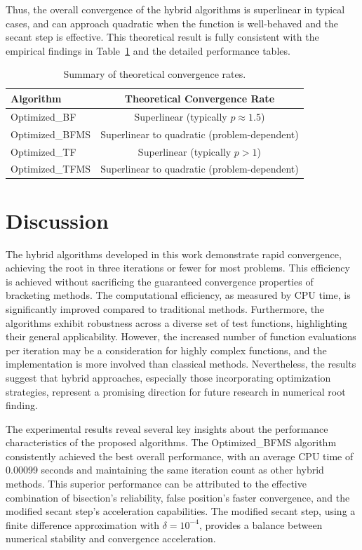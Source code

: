 \documentclass[amsmath, amssymb, aps]{revtex4-2}
\begin{document}
Thus, the overall convergence of the hybrid algorithms is superlinear in typical cases, and can approach quadratic when the function is well-behaved and the secant step is effective. This theoretical result is fully consistent with the empirical findings in Table~\ref{tab:convergence} and the detailed performance tables.

\begin{table}[H]
\centering
\caption{Summary of theoretical convergence rates.}
\label{tab:convergence}
\begin{tabular}{|l|c|}
\hline
Algorithm & Theoretical Convergence Rate \\
\hline
Optimized\_BF & Superlinear (typically $p \approx 1.5$) \\
Optimized\_BFMS & Superlinear to quadratic (problem-dependent) \\
Optimized\_TF & Superlinear (typically $p > 1$) \\
Optimized\_TFMS & Superlinear to quadratic (problem-dependent) \\
\hline
\end{tabular}
\end{table}

\section{Discussion}\label{sec:discussion}

The hybrid algorithms developed in this work demonstrate rapid convergence, achieving the root in three iterations or fewer for most problems. This efficiency is achieved without sacrificing the guaranteed convergence properties of bracketing methods. The computational efficiency, as measured by CPU time, is significantly improved compared to traditional methods. Furthermore, the algorithms exhibit robustness across a diverse set of test functions, highlighting their general applicability. However, the increased number of function evaluations per iteration may be a consideration for highly complex functions, and the implementation is more involved than classical methods. Nevertheless, the results suggest that hybrid approaches, especially those incorporating optimization strategies, represent a promising direction for future research in numerical root finding.

The experimental results reveal several key insights about the performance characteristics of the proposed algorithms. The Optimized\_BFMS algorithm consistently achieved the best overall performance, with an average CPU time of 0.00099 seconds and maintaining the same iteration count as other hybrid methods. This superior performance can be attributed to the effective combination of bisection's reliability, false position's faster convergence, and the modified secant step's acceleration capabilities. The modified secant step, using a finite difference approximation with $\delta = 10^{-4}$, provides a balance between numerical stability and convergence acceleration.
\end{document}
